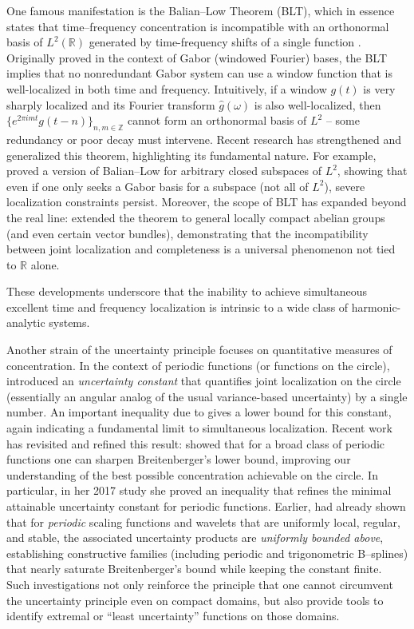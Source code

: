 \documentclass[preprint,hidelinks,authoryear]{elsarticle}
\theoremstyle{plain}
\theoremstyle{definition}
\theoremstyle{remark}
\begin{document}
One famous manifestation is the Balian–Low Theorem (BLT), which in essence states that time–frequency concentration is incompatible with an orthonormal basis of $L^2(\mathbb{R})$ generated by time-frequency shifts of a single function \cite{battle1988heisenberg}.  Originally proved in the context of Gabor (windowed Fourier) bases, the BLT implies that no nonredundant Gabor system can use a window function that is well-localized in both time and frequency.  Intuitively, if a window $g(t)$ is very sharply localized and its Fourier transform $\hat g(\omega)$ is also well-localized, then $\{e^{2\pi i m t}g(t-n)\}_{n,m\in\mathbb{Z}}$ cannot form an orthonormal basis of $L^2$ – some redundancy or poor decay must intervene.  Recent research has strengthened and generalized this theorem, highlighting its fundamental nature.  For example, \cite{caragea2023balian,caragea2021quantitative} proved a version of Balian–Low for arbitrary closed subspaces of $L^2$, showing that even if one only seeks a Gabor basis for a subspace (not all of $L^2$), severe localization constraints persist. Moreover, the scope of BLT has expanded beyond the real line: \cite{enstad2020balian} extended the theorem to general locally compact abelian groups (and even certain vector bundles), demonstrating that the incompatibility between joint localization and completeness is a universal phenomenon not tied to $\mathbb R$ alone.

These developments underscore that the inability to achieve simultaneous excellent time and frequency localization is intrinsic to a wide class of harmonic-analytic systems.

Another strain of the uncertainty principle focuses on quantitative measures of concentration.  In the context of periodic functions (or functions on the circle), \cite{breitenberger1985uncertainty} introduced an \emph{uncertainty constant} that quantifies joint localization on the circle (essentially an angular analog of the usual variance-based uncertainty) by a single number.  An important inequality due to \cite{breitenberger1985uncertainty} gives a lower bound for this constant, again indicating a fundamental limit to simultaneous localization.  Recent work has revisited and refined this result: \cite{lebedeva2017inequality} showed that for a broad class of periodic functions one can sharpen Breitenberger’s lower bound, improving our understanding of the best possible concentration achievable on the circle. In particular, in her 2017 study \cite{lebedeva2017inequality} she proved an inequality that refines the minimal attainable uncertainty constant for periodic functions. Earlier, \cite{goh2000uncertainty} had already shown that for \emph{periodic} scaling functions and wavelets that are uniformly local, regular, and stable, the associated uncertainty products are \emph{uniformly bounded above}, establishing constructive families (including periodic and trigonometric B–splines) that nearly saturate Breitenberger’s bound while keeping the constant finite. Such investigations not only reinforce the principle that one cannot circumvent the uncertainty principle even on compact domains, but also provide tools to identify extremal or “least uncertainty” functions on those domains.
\end{document}
